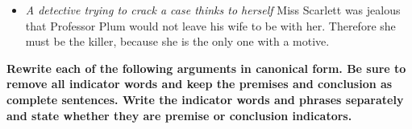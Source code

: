 \begin{itemize}
\item \textit{A detective trying to crack a case thinks to herself} Miss Scarlett was jealous that Professor Plum would not leave his wife to be with her. Therefore she must be the killer, because she is the only one with a motive.


\end{itemize}

\textbf{Rewrite each of the following arguments in canonical form. Be sure to remove all indicator words and keep the premises and conclusion as complete sentences. Write the indicator words and phrases separately and state whether they are premise or conclusion indicators.}

